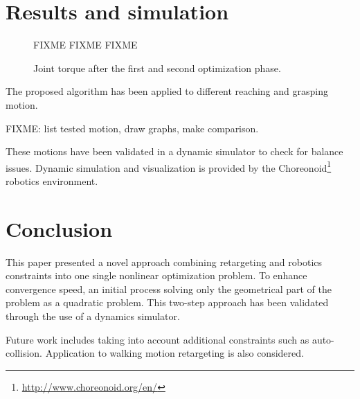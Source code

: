 \documentclass[letterpaper, 10 pt, conference]{ieeeconf}  %
\begin{document}
\section{Results and simulation}
\label{sec:results}


\begin{figure}[htbp!]
  FIXME FIXME FIXME
  \label{fig:results-torque}
  \caption{Joint torque after the first and second optimization
    phase.}
\end{figure}



The proposed algorithm has been applied to different reaching and
grasping motion.


FIXME: list tested motion, draw graphs, make comparison.


These motions have been validated in a dynamic simulator to check for
balance issues. Dynamic simulation and visualization is provided by
the Choreonoid\footnote{\url{http://www.choreonoid.org/en/}} robotics
environment.



\section{Conclusion}
\label{sec:conclusion}

This paper presented a novel approach combining retargeting and
robotics constraints into one single nonlinear optimization
problem. To enhance convergence speed, an initial process solving only
the geometrical part of the problem as a quadratic problem. This
two-step approach has been validated through the use of a dynamics
simulator.

Future work includes taking into account additional constraints such
as auto-collision. Application to walking motion retargeting is also
considered.


\end{document}
